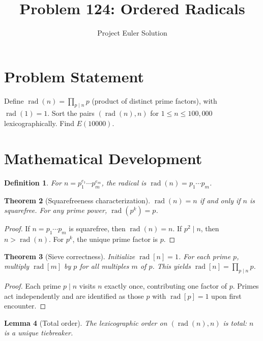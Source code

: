 \documentclass[11pt,a4paper]{article}
\title{Problem 124: Ordered Radicals}
\author{Project Euler Solution}
\date{}
\newtheorem{theorem}{Theorem}
\newtheorem{lemma}[theorem]{Lemma}
\newtheorem{definition}[theorem]{Definition}
\begin{document}
\maketitle

\section{Problem Statement}

Define $\operatorname{rad}(n) = \prod_{p \mid n} p$ (product of distinct prime factors), with $\operatorname{rad}(1) = 1$. Sort the pairs $(\operatorname{rad}(n), n)$ for $1 \le n \le 100{,}000$ lexicographically. Find $E(10000)$.

\section{Mathematical Development}

\begin{definition}
For $n = p_1^{e_1} \cdots p_m^{e_m}$, the radical is $\operatorname{rad}(n) = p_1 \cdots p_m$.
\end{definition}

\begin{theorem}[Squarefreeness characterization]
$\operatorname{rad}(n) = n$ if and only if $n$ is squarefree. For any prime power, $\operatorname{rad}(p^k) = p$.
\end{theorem}

\begin{proof}
If $n = p_1 \cdots p_m$ is squarefree, then $\operatorname{rad}(n) = n$. If $p^2 \mid n$, then $n > \operatorname{rad}(n)$. For $p^k$, the unique prime factor is $p$.
\end{proof}

\begin{theorem}[Sieve correctness]
Initialize $\operatorname{rad}[n] = 1$. For each prime $p$, multiply $\operatorname{rad}[m]$ by $p$ for all multiples $m$ of $p$. This yields $\operatorname{rad}[n] = \prod_{p \mid n} p$.
\end{theorem}

\begin{proof}
Each prime $p \mid n$ visits $n$ exactly once, contributing one factor of $p$. Primes act independently and are identified as those $p$ with $\operatorname{rad}[p] = 1$ upon first encounter.
\end{proof}

\begin{lemma}[Total order]
The lexicographic order on $(\operatorname{rad}(n), n)$ is total: $n$ is a unique tiebreaker.
\end{lemma}
\end{document}
